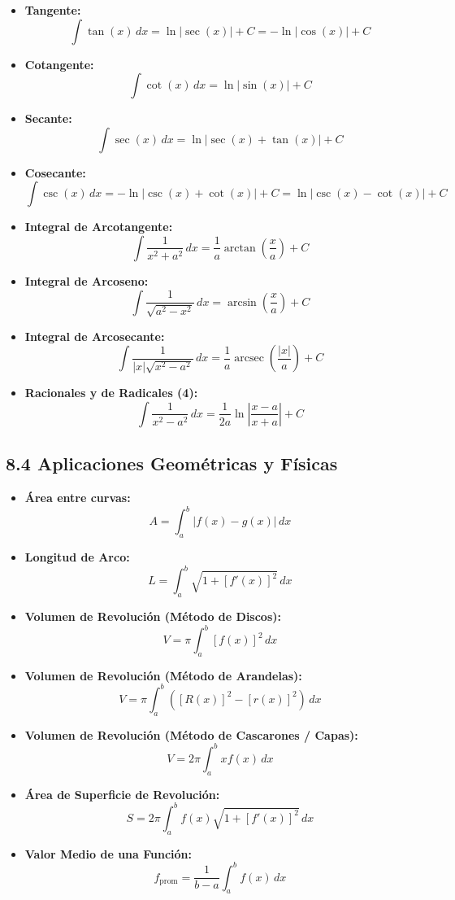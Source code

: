 \documentclass[11pt,a4paper]{article}
\begin{document}
\begin{itemize}
  \item \textbf{Tangente:}
  \[
    \int \tan(x) \, dx = \ln|\sec(x)| + C = -\ln|\cos(x)| + C
  \]
  \item \textbf{Cotangente:}
  \[
    \int \cot(x) \, dx = \ln|\sin(x)| + C
  \]
  \item \textbf{Secante:}
  \[
    \int \sec(x) \, dx = \ln|\sec(x) + \tan(x)| + C
  \]
  \item \textbf{Cosecante:}
  \[
    \int \csc(x) \, dx = -\ln|\csc(x) + \cot(x)| + C = \ln|\csc(x) - \cot(x)| + C
  \]
  \item \textbf{Integral de Arcotangente:}
  \[
    \int \frac{1}{x^2 + a^2} \, dx = \frac{1}{a} \arctan\left(\frac{x}{a}\right) + C
  \]
  \item \textbf{Integral de Arcoseno:}
  \[
    \int \frac{1}{\sqrt{a^2 - x^2}} \, dx = \arcsin\left(\frac{x}{a}\right) + C
  \]
  \item \textbf{Integral de Arcosecante:}
  \[
    \int \frac{1}{|x|\sqrt{x^2 - a^2}} \, dx = \frac{1}{a} \operatorname{arcsec}\left(\frac{|x|}{a}\right) + C
  \]
  \item \textbf{Racionales y de Radicales (4):}
  \[
    \int \frac{1}{x^2 - a^2} \, dx = \frac{1}{2a} \ln\left|\frac{x - a}{x + a}\right| + C
  \]
\end{itemize}

\subsection*{8.4 Aplicaciones Geométricas y Físicas}

\begin{itemize}
  \item \textbf{Área entre curvas:}
  \[
    A = \int_a^b |f(x) - g(x)| \, dx
  \]
  \item \textbf{Longitud de Arco:}
  \[
    L = \int_a^b \sqrt{1 + [f'(x)]^2} \, dx
  \]
  \item \textbf{Volumen de Revolución (Método de Discos):}
  \[
    V = \pi \int_a^b [f(x)]^2 \, dx
  \]
  \item \textbf{Volumen de Revolución (Método de Arandelas):}
  \[
    V = \pi \int_a^b ([R(x)]^2 - [r(x)]^2) \, dx
  \]
  \item \textbf{Volumen de Revolución (Método de Cascarones / Capas):}
  \[
    V = 2\pi \int_a^b x f(x) \, dx
  \]
  \item \textbf{Área de Superficie de Revolución:}
  \[
    S = 2\pi \int_a^b f(x) \sqrt{1 + [f'(x)]^2} \, dx
  \]
  \item \textbf{Valor Medio de una Función:}
  \[
    f_{\text{prom}} = \frac{1}{b - a} \int_a^b f(x) \, dx
  \]
\end{itemize}
\end{document}
